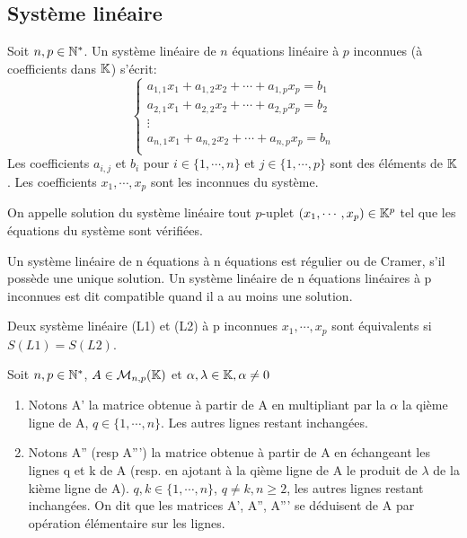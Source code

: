 \documentclass[a4paper, 12pt]{article}
\begin{document}
\subsection{Système linéaire}

\begin{definition}
    Soit $n, p \in \mathbb{N}^*$. Un système linéaire de $n$ équations linéaire à $p$ inconnues (à coefficients dans $\mathbb{K}$) s'écrit:
    $$
    \begin{cases}
        a_{1,1}x_1 + a_{1,2}x_2 + \cdots + a_{1,p}x_p = b_1 \\
        a_{2,1}x_1 + a_{2,2}x_2 + \cdots + a_{2,p}x_p = b_2 \\
        \vdots \\
        a_{n,1}x_1 + a_{n,2}x_2 + \cdots + a_{n,p}x_p = b_n \\
    \end{cases}
    $$
    Les coefficients $a_{i,j}$ et $b_i$ pour $i \in \{1, \cdots, n\}$ et $j \in \{1, \cdots, p\}$ sont des éléments de $\mathbb{K}$.
    Les coefficients $x_1, \cdots, x_p$ sont les inconnues du système.

    On appelle solution du système linéaire tout $p$-uplet $(x_1, \cdots, x_p) \in \mathbb{K}^p$ tel que les équations du système sont vérifiées.
\end{definition}


\begin{definition}
    Un système linéaire de n équations à n équations est régulier ou de Cramer, s'il possède une unique solution.
    Un système linéaire de n équations linéaires à p inconnues est dit compatible quand il a au moins une solution.
\end{definition}

\begin{definition}
    Deux système linéaire (L1) et (L2) à p inconnues $x_1, \cdots, x_p$ sont équivalents si $S(L1) = S(L2)$.
\end{definition}

\begin{definition}
    Soit $n, p \in \mathbb{N}^*$, $A \in \mathcal{M}_{n,p}(\mathbb{K})$ et $\alpha, \lambda \in \mathbb{K}, \alpha \neq 0$
    \begin{enumerate}
        \item Notons A' la matrice obtenue à partir de A en multipliant par la $\alpha$ la qième ligne de A, $q \in \{1, \cdots, n\}$. Les autres lignes restant inchangées.
        \item Notons A'' (resp A''') la matrice obtenue à partir de A en échangeant les lignes q et k de A (resp. en ajotant à la qième ligne de A le produit de $\lambda$ de la kième ligne de A).
        $q, k \in \{1, \cdots, n\}$, $q \neq k, n \geq 2$, les autres lignes restant inchangées.
        On dit que les matrices A', A'', A''' se déduisent de A par opération élémentaire sur les lignes.
    \end{enumerate}
\end{definition}

\end{document}
